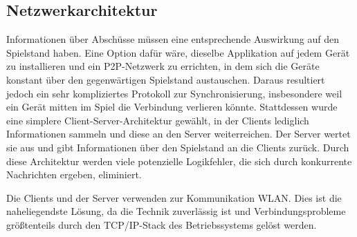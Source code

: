 \subsection{Netzwerkarchitektur}
\label{sec:architektur-netzwerkarchitektur}

Informationen über Abschüsse müssen eine entsprechende Auswirkung auf den Spielstand haben.
Eine Option dafür wäre, dieselbe Applikation auf jedem Gerät zu installieren und ein P2P-Netzwerk zu
errichten, in dem sich die Geräte konstant über den gegenwärtigen Spielstand austauschen.
Daraus resultiert jedoch ein sehr kompliziertes Protokoll zur Synchronisierung, insbesondere weil
ein Gerät mitten im Spiel die Verbindung verlieren könnte.
Stattdessen wurde eine simplere Client-Server-Architektur gewählt, in der Clients lediglich
Informationen sammeln und diese an den Server weiterreichen.
Der Server wertet sie aus und gibt Informationen über den Spielstand an die Clients zurück.
Durch diese Architektur werden viele potenzielle Logikfehler, die sich durch konkurrente Nachrichten
ergeben, eliminiert.

Die Clients und der Server verwenden zur Kommunikation WLAN. Dies ist die naheliegendste Lösung, da
die Technik zuverlässig ist und Verbindungsprobleme größtenteils durch den TCP/IP-Stack des
Betriebssystems gelöst werden.